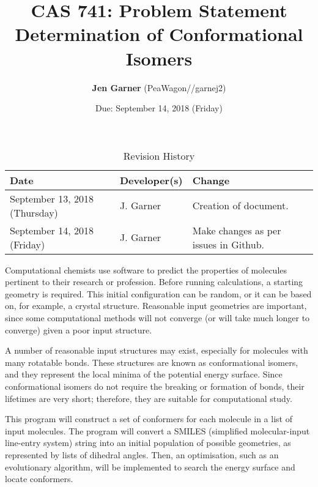 \documentclass{article}
\title{{CAS 741: Problem Statement}\\{\Large Determination of Conformational 
Isomers}}
\author{\textbf{Jen Garner} (PeaWagon//garnej2)}
\date{Due: September 14, 2018 (Friday)}
\begin{document}
\maketitle

\begin{table}[hp]
\caption{Revision History} \label{TblRevisionHistory}
\begin{tabularx}{\textwidth}{llX}
\toprule
\textbf{Date} & \textbf{Developer(s)} & \textbf{Change}\\
\midrule
September 13, 2018 (Thursday) & J. Garner & Creation of document. \\
September 14, 2018 (Friday) & J. Garner & Make changes as per issues in Github. 
\\
\bottomrule
\end{tabularx}
\end{table}


\vspace{2mm} %

Computational chemists use software to predict the properties of molecules pertinent to their research or profession. Before running calculations, a starting geometry is required. This initial configuration can be random, or it can be based on, for example, a crystal structure. Reasonable input geometries are important, since some computational methods will not converge (or will take much longer to converge) given a poor input structure. 

A number of reasonable input structures may exist, especially for molecules with many rotatable bonds. These structures are known as conformational isomers, and they represent the local minima of the potential energy surface. Since conformational isomers do not require the breaking or formation of bonds, their lifetimes are very short; therefore, they are suitable for computational study.

\vspace{3mm} %


\vspace{2mm} %

This program will construct a set of conformers for each molecule in a list of 
input molecules. The program will convert a SMILES (simplified molecular-input 
line-entry system) string into an initial population of possible geometries, as 
represented by lists of dihedral angles. Then, an optimisation, such as an 
evolutionary algorithm, will be implemented to search the energy surface and 
locate conformers.
\end{document}
